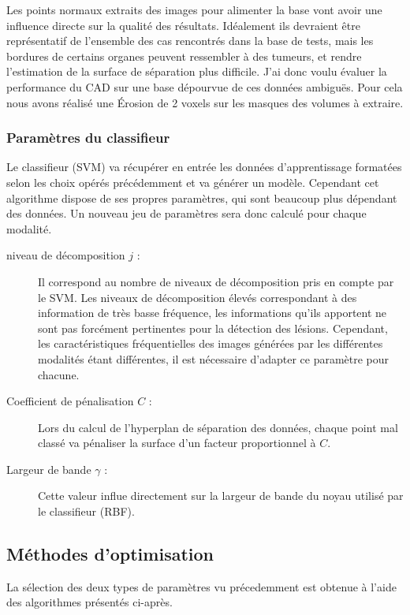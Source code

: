 Les points normaux extraits des images pour alimenter la base vont avoir une influence directe sur la qualité des résultats. Idéalement ils devraient être représentatif de l'ensemble des cas rencontrés dans la base de tests, mais les bordures de certains organes peuvent ressembler à des tumeurs, et rendre l'estimation de la surface de séparation plus difficile. J'ai donc voulu évaluer la performance du CAD sur une base dépourvue de ces données ambiguës. Pour cela nous avons réalisé une Érosion de 2 voxels sur les masques des volumes à extraire.

\subsubsection{Paramètres du classifieur}

Le classifieur (SVM) va récupérer en entrée les données d'apprentissage formatées selon les choix opérés précédemment et va générer un modèle. Cependant cet algorithme dispose de ses propres paramètres, qui sont beaucoup plus dépendant des données. Un nouveau jeu de paramètres sera donc calculé pour chaque modalité.

\begin{description}
 \item[niveau de décomposition $j$ :] Il correspond au nombre de niveaux de décomposition pris en compte par le SVM. Les niveaux de décomposition élevés correspondant à des information de très basse fréquence, les informations qu'ils apportent ne sont pas forcément pertinentes pour la détection des lésions. Cependant, les caractéristiques fréquentielles des images générées par les différentes modalités étant différentes, il est nécessaire d'adapter ce paramètre pour chacune.
 \item[Coefficient de pénalisation $C$ :] Lors du calcul de l'hyperplan de séparation des données, chaque point mal classé va pénaliser la surface d'un facteur proportionnel à $C$.
 \item[Largeur de bande $\gamma$ :] Cette valeur influe directement sur la largeur de bande du noyau utilisé par le classifieur (RBF).
\end{description}

\subsection{Méthodes d'optimisation}

La sélection des deux types de paramètres vu précedemment est obtenue à l'aide des algorithmes présentés ci-après. 

